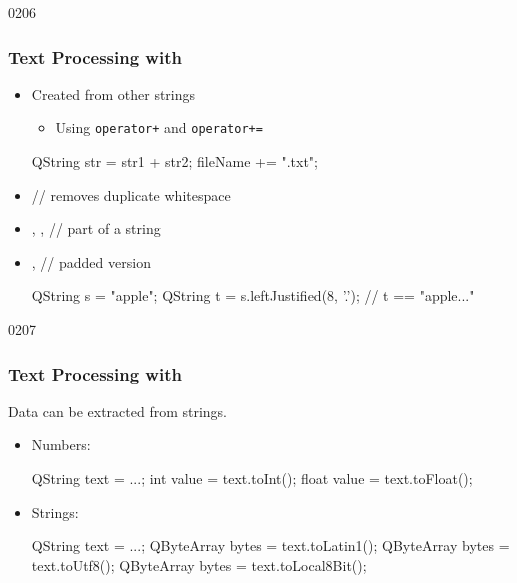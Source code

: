 \begin{slide}[fragile]{0206}\frametitle{Text Processing with }
  \begin{itemize}
  \item Created from other strings
    \begin{itemize}
    \item Using \texttt{operator+} and \texttt{operator+=}    
    \end{itemize}
 \begin{cpp}    
QString str = str1 + str2;
fileName += ".txt";
  \end{cpp}
 \item {} // removes duplicate whitespace
 \item{}, ,
    // part of a string
  \item {},
     // padded version
 \begin{cpp}
QString s = "apple";
QString t = s.leftJustified(8, '.'); // t == "apple..."
  \end{cpp}
  \end{itemize}
\end{slide}

\begin{slide}[fragile]{0207}\frametitle{Text Processing with }
  Data can be extracted from strings.
  \vspace*{1em}
  
  \begin{itemize}
  \item Numbers:
 \begin{cpp}
QString text = ...; 
int value = text.toInt();
float value = text.toFloat();
  \end{cpp}
 \item Strings:
 \begin{cpp}
QString text = ...;
QByteArray bytes = text.toLatin1();
QByteArray bytes = text.toUtf8();
QByteArray bytes = text.toLocal8Bit();
  \end{cpp}
  \end{itemize}
\end{slide}


